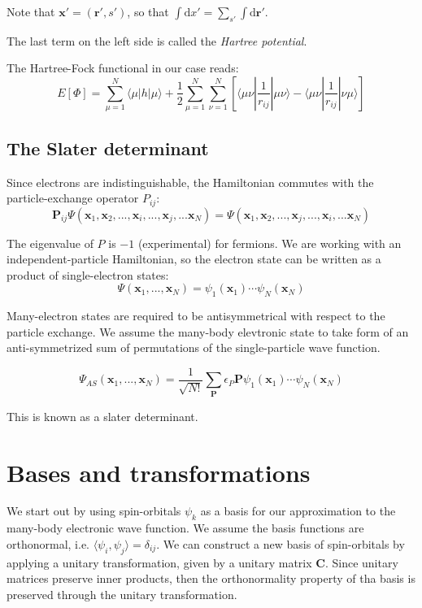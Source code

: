 \documentclass[a4paper,10pt, twocolumn, pre]{revtex4}
\newcommand{\rvec}{\mathbf{r}}
\newcommand{\xvec}{\mathbf{x}}
\newcommand{\dd}{\mathrm{d}}
\newcommand{\Pvec}{\mathbf{P}}
\newcommand{\mb}{\mathbf}
\begin{document}
Note that $\xvec' = (\rvec', s')$, so that $\int \dd x' = \sum_{s'} \int \dd \rvec'$.

The last term on the left side is called the \emph{Hartree potential}. 

The Hartree-Fock functional in our case reads:
\begin{equation}
	E[\Phi] = \sum_{\mu = 1}^N \langle \mu |h|\mu \rangle + \frac{1}{2} \sum_{\mu = 1}^N\sum_{\nu=1}^N \left[ \langle \mu\nu |\frac{1}{r_{ij}}| \mu\nu\rangle - \langle \mu\nu |\frac{1}{r_{ij}}| \nu\mu\rangle \right]
\end{equation}

\subsection{The Slater determinant}
Since electrons are indistinguishable, the Hamiltonian commutes with the particle-exchange operator $P_{ij}$:
\begin{equation}
	\Pvec_{ij}\Psi(\xvec_1, \xvec_2, ..., \xvec_i, ..., \xvec_j, ... \xvec_N) = \Psi(\xvec_1, \xvec_2, ..., \xvec_j, ..., \xvec_i, ... \xvec_N)
\end{equation}

The eigenvalue of $P$ is $-1$ (experimental) for fermions. We are working with an independent-particle Hamiltonian, so the electron state can be written as a product of single-electron states:
\begin{equation}
	\Psi(\xvec_1, ..., \xvec_N) = \psi_1(\xvec_1)\cdots\psi_N(\xvec_N)
\end{equation}

Many-electron states are required to be antisymmetrical with respect to the particle exchange. We assume the many-body elevtronic state to take form of an anti-symmetrized sum of permutations of the single-particle wave function. 

\begin{equation}
	\Psi_{AS} (\xvec_1, ..., \xvec_N) = \frac{1}{\sqrt{N!}} \sum_\mb{P} \epsilon_P \mb{P} \psi_1(\xvec_1) \cdots \psi_N(\xvec_N)
\end{equation}

This is known as a slater determinant.

\section{Bases and transformations}
We start out by using spin-orbitals $\psi_k$ as a basis for our approximation to the many-body electronic wave function. We assume the basis functions are orthonormal, i.e. $\langle \psi_i, \psi_j \rangle = \delta_{ij}$. We can construct a new basis of spin-orbitals by applying a unitary transformation, given by a unitary matrix $\mb{C}$. Since unitary matrices preserve inner products, then the orthonormality property of tha basis is preserved through the unitary transformation. 
\end{document}
